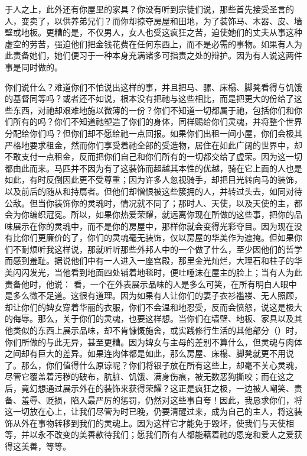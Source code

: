 于人之上，此外还有你屋里的家具？你没有听到宗徒们说，那些首先接受圣言的人，变卖了，以供养弟兄们？而你却掠夺房屋和田地，为了装饰马、木器、皮、墙壁或地板。更糟的是，不仅男人，女人也受这疯狂之苦，迫使她们的丈夫从事这种虚空的劳苦，强迫他们把金钱花费在任何东西上，而不是必需的事物。如果有人为此责备她们，她们便习于一种本身充满诸多可指责之处的辩护。因为有人说这两件事是同时做的。\par

你们说什么？难道你们不怕说出这样的事，并且把马、骡、床榻、脚凳看得与饥饿的基督同等吗？或者还不如说，根本没有把祂与这些相比，而是把更大的份给了这些东西，对祂却艰难地施以微薄的一份？你们不知道一切都属于祂，包括你们和你们所有的吗？你们不知道祂塑造了你们的身体，同样赐给你们灵魂，并将整个世界分配给你们吗？但你们却不愿给祂一点回报。如果你们出租一间小屋，你们会极其严格地要求租金，然而你们享受着祂全部的受造物，居住在如此广阔的世界中，却不敢支付一点租金，反而把你们自己和你们所有的一切都交给了虚荣。因为这一切都由此而来。马匹并不因为有了这装饰而超越其本性的优越，骑在它上面的人也是如此，有时反倒因此更不受尊重；因为许多人忽视骑手，却把目光转向马的装饰，以及前后的随从和持扇者。但他们却憎恨被这些簇拥的人，并转过头去，如同对待公敌。但当你装饰你的灵魂时，情况就不同了；那时人、天使，以及天使的主，都会为你编织冠冕。所以，如果你热爱荣耀，就远离你现在所做的这些事，把你的品味展示在你的灵魂中，而不是你的房屋中，那样你就会变得光彩夺目。因为现在没有比你们更廉价的了，你们的灵魂毫无装饰，仅以房屋的华美作为遮掩。但如果你们不耐烦听我这样说，那就听听那些外邦人中的一个做了什么，至少因他们的哲学而感到羞耻。据说他们中有一人进入一座宫殿，那里金光灿烂，大理石和柱子的华美闪闪发光，当他看到地面四处铺着地毯时，便吐唾沫在屋主的脸上；当有人为此责备他时，他说： 看，一个在外表展示品味的人是多么可笑，在所有明白人眼中是多么微不足道。这很有道理。因为如果有人让你们的妻子衣衫褴褛、无人照顾，却让你们的婢女穿着华丽的衣服，你们不会温和地忍受，反而会愤怒，说这是极大的侮辱。那么，关于你们的灵魂，也要这样想。当你们在墙壁、地板、家具以及其他类似的东西上展示品味，却不肯慷慨施舍，或实践修行生活的其他部分（）时，你们所做的与此无异，甚至更糟。因为婢女与主母的差别不算什么，但灵魂与肉体之间却有巨大的差异。如果连肉体都是如此，那么房屋、床榻、脚凳就更不用说了。那么，你们值得什么原谅呢？你们将银子放在所有这些上，却毫不关心灵魂，尽管它覆盖着污秽的破布，肮脏、饥饿、满身伤痕，被无数恶狗撕咬；而在这之后，竟幻想通过展示外在的装饰来获得荣耀？这正是疯狂之极，一边被人嘲笑、责备、羞辱、贬损，陷入最严厉的惩罚，仍然对这些事自夸！因此，我恳求你们，将这一切放在心上，让我们尽管为时已晚，仍要清醒过来，成为自己的主人，将这装饰从外在事物转移到我们的灵魂上。因为这样它才能免于毁坏，使我们与天使相等，并以永不改变的美善款待我们；愿我们所有人都能藉着祂的恩宠和爱人之爱获得这美善，等等。\par

